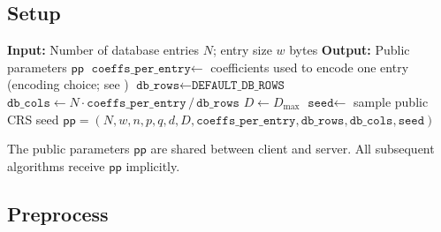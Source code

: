 \documentclass[11pt,a4paper]{article}
\begin{document}
\subsection{Setup}\label{sec:setup}

\begin{algorithm}[H]
\caption{$\textsc{Setup}(N, w)$}
\label{alg:setup}
\begin{algorithmic}[1]
\State \textbf{Input:} Number of database entries $N$; entry size $w$ bytes
\State \textbf{Output:} Public parameters $\mathsf{pp}$
\Statex
\State $\texttt{coeffs\_per\_entry} \gets$ coefficients used to encode one entry (encoding choice; see )
\State $\texttt{db\_rows} \gets \texttt{DEFAULT\_DB\_ROWS}$ 
\State $\texttt{db\_cols} \gets N \cdot \texttt{coeffs\_per\_entry} \,/\, \texttt{db\_rows}$
\State $D \gets D_{\max}$ 
\State $\texttt{seed} \gets$ sample public CRS seed
\State \Return $\mathsf{pp} = (N, w, n, p, q, d, D, \texttt{coeffs\_per\_entry}, \texttt{db\_rows}, \texttt{db\_cols}, \texttt{seed})$
\end{algorithmic}
\end{algorithm}

The public parameters $\mathsf{pp}$ are shared between client and server. All subsequent algorithms receive $\mathsf{pp}$ implicitly.

\subsection{Preprocess}\label{sec:preprocess}
\end{document}
